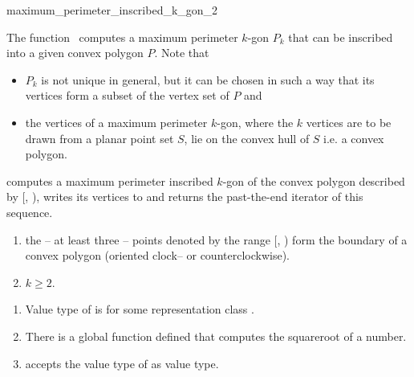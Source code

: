 \begin{ccRefFunction}{maximum_perimeter_inscribed_k_gon_2}
  
  \ccDefinition The function \ccRefName\ computes a maximum perimeter
  $k$-gon $P_k$ that can be inscribed into a given convex polygon $P$.
  Note that
  \begin{itemize}
  \item $P_k$ is not unique in general, but it can be chosen in such a
    way that its vertices form a subset of the vertex set of $P$ and
  \item the vertices of a maximum perimeter $k$-gon, where the $k$
    vertices are to be drawn from a planar point set $S$, lie on the
    convex hull of $S$ i.e. a convex polygon.
  \end{itemize}


  \def\ccLongParamLayout{\ccTrue}
  
  computes a maximum perimeter inscribed $k$-gon of the convex polygon
  described by [, ), writes its
  vertices to  and returns the past-the-end iterator of this
  sequence.

  \ccPrecond
  \begin{enumerate}
  \item the -- at least three -- points denoted by the range
    [, ) form the boundary of a
    convex polygon (oriented clock-- or counterclockwise).
  \item $k \ge 2$.
  \end{enumerate}

  \ccRequire
  \begin{enumerate}
  \item Value type of  is 
    for some representation class .
  \item There is a global function 
    defined that computes the squareroot of a number.
  \item {} accepts the value type of
     as value type.
  \end{enumerate}

  \ccTagDefaults


\end{ccRefFunction}
